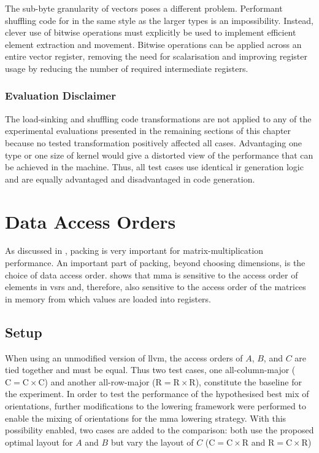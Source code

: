 \documentclass[\main/thesis.tex]{subfiles}
\begin{document}
The sub-byte granularity of  vectors poses a different problem.
Performant shuffling code for  in the same style as the larger types is an impossibility.
Instead, clever use of bitwise operations must explicitly be used to implement efficient element extraction and movement.
Bitwise operations can be applied across an entire vector register, removing the need for scalarisation and improving register usage by reducing the number of required intermediate registers.

\subsubsection{Evaluation Disclaimer}
The load-sinking and shuffling code transformations are not applied to any of the experimental evaluations presented in the remaining sections of this chapter because no tested transformation positively affected all cases.
Advantaging one type or one size of kernel would give a distorted view of the performance that can be achieved in the machine.
Thus, all test cases use identical \gls{ir} generation logic and are equally advantaged and disadvantaged in code generation.

\section{Data Access Orders}
\label{sec:variedOrders}
As discussed in , packing is very important for matrix-multiplication performance.
An important part of packing, beyond choosing dimensions, is the choice of data access order.
 shows that \gls{mma} is sensitive to the access order of elements in \glspl{vsr} and, therefore, also sensitive to the access order of the matrices in memory from which values are loaded into registers.

\subsection{Setup}
When using an unmodified version of \gls{llvm}, the access orders of $A$, $B$, and $C$ are tied together and must be equal.
Thus two test cases, one all-column-major ($\textrm{C} = \textrm{C} \times \textrm{C}$) and another all-row-major ($\textrm{R} = \textrm{R} \times \textrm{R}$), constitute the baseline for the experiment.
In order to test the performance of the hypothesised best mix of orientations, further modifications to the \gls{lowering} framework were performed to enable the mixing of orientations for the \gls{mma} lowering strategy.
With this possibility enabled, two cases are added to the comparison: both use the proposed optimal layout for $A$ and $B$ but vary the layout of $C$ ($\textrm{C} = \textrm{C} \times \textrm{R}$ and $\textrm{R} = \textrm{C} \times \textrm{R}$)
\end{document}
